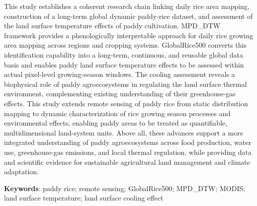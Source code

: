 This study establishes a coherent research chain linking daily rice area mapping, construction of a long-term global dynamic paddy-rice dataset, and assessment of the land surface temperature effects of paddy cultivation.
MPD\_DTW framework provides a phenologically interpretable approach for daily rice growing area mapping across regions and cropping systems.
GlobalRice500 converts this identification capability into a long-term, continuous, and reusable global data basis and enables paddy land surface temperature effects to be assessed within actual pixel-level growing-season windows.
The cooling assessment reveals a biophysical role of paddy agroecosystems in regulating the land surface thermal environment, complementing existing understanding of their greenhouse-gas effects.
This study extends remote sensing of paddy rice from static distribution mapping to dynamic characterization of rice growing season processes and environmental effects, enabling paddy areas to be treated as quantifiable, multidimensional land-system units.
Above all, these advances support a more integrated understanding of paddy agroecosystems across food production, water use, greenhouse-gas emissions, and local thermal regulation, while providing data and scientific evidence for sustainable agricultural land management and climate adaptation.

\noindent \textbf{Keywords}: paddy rice; remote sensing; GlobalRice500; MPD\_DTW; MODIS; land surface temperature; land surface cooling effect
